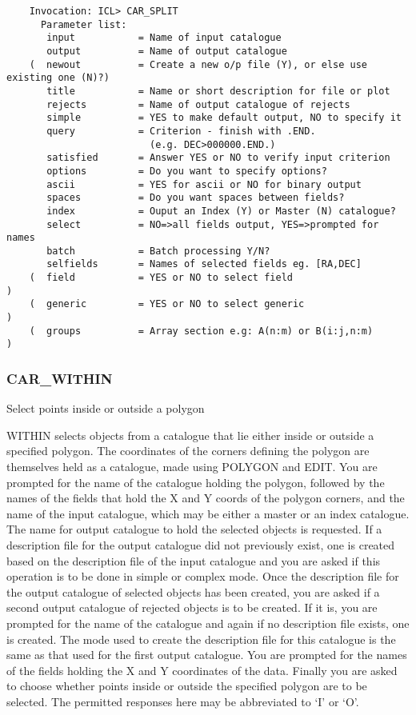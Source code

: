 \begin{verbatim}
    Invocation: ICL> CAR_SPLIT
      Parameter list:
       input           = Name of input catalogue
       output          = Name of output catalogue
    (  newout          = Create a new o/p file (Y), or else use existing one (N)?)
       title           = Name or short description for file or plot
       rejects         = Name of output catalogue of rejects
       simple          = YES to make default output, NO to specify it
       query           = Criterion - finish with .END.
                         (e.g. DEC>000000.END.)
       satisfied       = Answer YES or NO to verify input criterion
       options         = Do you want to specify options?
       ascii           = YES for ascii or NO for binary output
       spaces          = Do you want spaces between fields?
       index           = Ouput an Index (Y) or Master (N) catalogue?
       select          = NO=>all fields output, YES=>prompted for names
       batch           = Batch processing Y/N?
       selfields       = Names of selected fields eg. [RA,DEC]
    (  field           = YES or NO to select field                               )
    (  generic         = YES or NO to select generic                             )
    (  groups          = Array section e.g: A(n:m) or B(i:j,n:m)                 )
\end{verbatim}

\subsubsection{CAR\_WITHIN}

Select points inside or outside a polygon

WITHIN selects objects from a catalogue that lie either inside or outside
a specified polygon.
The coordinates of the corners defining the polygon are themselves held as
a catalogue, made using POLYGON and EDIT.
You are prompted for the name of the catalogue holding the polygon,
followed by the names of the fields that hold the X and Y coords of the
polygon corners, and the name of the input catalogue, which may be either
a master or an index catalogue.
The name for output catalogue to hold the selected objects is requested.
If a description file for the output catalogue did not previously exist, one
is created based on the description file of the input catalogue and you are
asked if this operation is to be done in simple or complex mode.
Once the description file for the output catalogue of selected objects has
been created, you are asked if a second output catalogue of rejected
objects is to be created.
If it is, you are prompted for the name of the catalogue and again if
no description file exists, one is created.
The mode used to create the description file for this catalogue is the same
as that used for the first output catalogue.
You are prompted for the names of the fields holding the X and Y
coordinates of the data.
Finally you are asked to choose whether points inside or outside the
specified polygon are to be selected.
The permitted responses here may be abbreviated to `I' or `O'.


